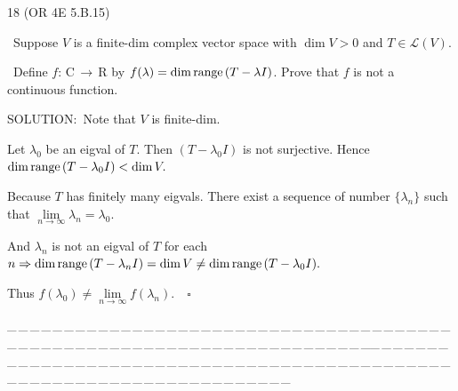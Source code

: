 \documentclass[a4paper, 11pt, UTF8]{article}
\def\range{\textup{range}\,}
\def\Lm{\mathcal{L}}
\def\Rbf{$\,{\timesbf R}\,$}
\def\Cbf{$\,{\timesbf C}\,$}
\begin{document}
\begin{large}
{\timesbf\Large 18} ({\normalsize O{\small R} 4E 5.B.15})\par\quad\, {\timessl\Large 
Suppose $V$ is a finite-dim complex vector space with $\dim V > 0$ and $T\in\Lm(V)$.}\par\quad\,
{\timessl\Large Define $f:\Cbf\rightarrow\Rbf\,$by $f(\lambda) = \dim \range(T-\lambda I)$.
Prove that $f$ is not a continuous function.
}\par
{\timesbf S\footnotesize{OLUTION:}}\,\,\,Note that $V$ is finite-dim.\par\quad
Let $\lambda_0$ be an eigval of $T.$ Then $(T-\lambda_0 I)$ is not surjective. Hence $\dim\range(T-\lambda_0 I)<\dim V.$\par\quad
Because $T$ has finitely many eigvals. There exist a sequence of number $\{\lambda_n\}$ such that $\lim\limits_{n\rightarrow\infty}\lambda_n=\lambda_0$.\par\quad
And $\lambda_n$ is not an eigval of $T$ for each $n\Rightarrow\dim\range(T-\lambda_n I)=\dim V\neq \dim\range(T-\lambda_0 I).$\par\quad
Thus $f(\lambda_0)\neq \lim\limits_{n\rightarrow\infty}f(\lambda_n).\quad\square$\par
{\tiny \_\,\_\,\_\,\_\,\_\,\_\,\_\,\_\,\_\,\_\,\_\,\_\,\_\,\_\,\_\,\_\,\_\,\_\,\_\,\_\,\_\,\_\,\_\,\_\,\_\,\_\,\_\,\_\,\_\,\_\,\_\,\_\,\_\,\_\,\_\,\_\,\_\,\_\,\_\,\_\,\_\,\_\,\_\,\_\,\_\,\_\,\_\,\_\,\_\,\_\,\_\,\_\,\_\,\_\,\_\,\_\,\_\,\_\,\_\,\_\,\_\,\_\,\_\,\_\,\_\,\_\,\_\,\_\,\_\,\_\,\_\_\,\_\,\_\,\_\,\_\,\_\,\_\,\_\,\_\,\_\,\_\,\_\,\_\,\_\,\_\,\_\,\_\,\_\,\_\,\_\,\_\,\_\,\_\,\_\,\_\,\_\,\_\,\_\,\_\,\_\,\_\,\_\,\_\,\_\,\_\,\_\,\_\,\_\,\_\,\_\,\_\,\_\,\_\,\_\,\_\,\_\,\_\,\_\,\_\,\_\,\_\,\_\,\_\,\_\,\_\,\_\,\_\,\_\,\_\,\_\,\_\,\_\,\_\,\_\,\_\,\_\,\_\,\_\,\_\,\_\,\_}\par


\end{large}
\end{document}
